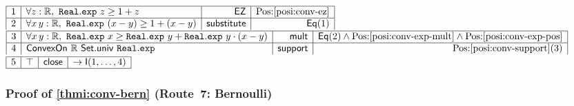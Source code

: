 \documentclass[11pt,reqno]{amsart}
\theoremstyle{redplain}
\numberwithin{equation}{section}
\begin{document}
\begin{center}
$%
\begin{array}{|c|l|r|r|}
\hline
1 & \forall z:\mathbb{R},\ \mathtt{Real.exp}\ z\geq 1+z & \mathsf{EZ} & %
\mbox{Pos:\ref{posi:conv-ez}} \\ \hline
2 & \forall x\,y:\mathbb{R},\ \mathtt{Real.exp}\ (x-y)\geq 1+(x-y) & \mathsf{%
substitute} & \mathsf{Eq}(1)%
\end{array}%
$ \noindent $%
\begin{array}{|c|l|r|r|}
\hline
3 & \forall x\,y:\mathbb{R},\ \mathtt{Real.exp}\ x\geq \mathtt{Real.exp}\ y+%
\mathtt{Real.exp}\ y\cdot (x-y) & \mathsf{mult} & \mathsf{Eq}(2)\wedge %
\mbox{Pos:\ref{posi:conv-exp-mult}}\wedge \mbox{Pos:\ref{posi:conv-exp-pos}}
\\ \hline
4 & \mathsf{ConvexOn}\ \mathbb{R}\ \mathsf{Set.univ}\ \mathtt{Real.exp} & 
\mathsf{support} & \mbox{Pos:\ref{posi:conv-support}(3)}%
\end{array}%
$ \noindent $%
\begin{array}{|c|l|r|r|}
\hline
5 & \top & \mathsf{close} & \rightarrow \mathsf{I}(1,\dots ,4) \\ \hline
\end{array}%
$
\end{center}

\subsubsection*{Proof of \autoref{thmi:conv-bern} (Route~7: Bernoulli)}
\end{document}

